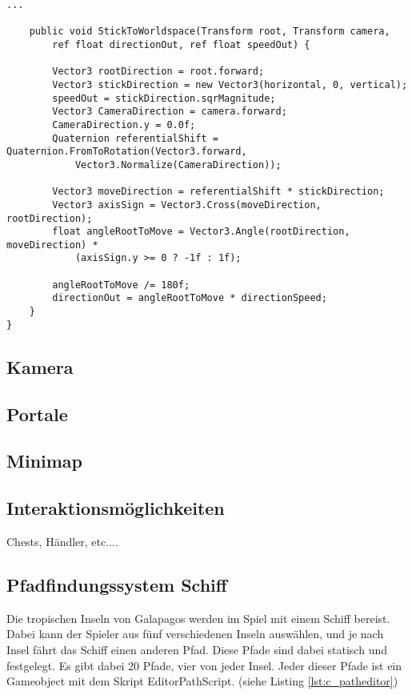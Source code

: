 \begin{scriptsize}
\begin{lstlisting}[label=lst:c_charactercontroller]
    ...

    public void StickToWorldspace(Transform root, Transform camera, 
    	ref float directionOut, ref float speedOut) {
    	
        Vector3 rootDirection = root.forward;
        Vector3 stickDirection = new Vector3(horizontal, 0, vertical);
        speedOut = stickDirection.sqrMagnitude;
        Vector3 CameraDirection = camera.forward;
        CameraDirection.y = 0.0f;
        Quaternion referentialShift = Quaternion.FromToRotation(Vector3.forward, 
        	Vector3.Normalize(CameraDirection));
        	
        Vector3 moveDirection = referentialShift * stickDirection;
        Vector3 axisSign = Vector3.Cross(moveDirection, rootDirection);
        float angleRootToMove = Vector3.Angle(rootDirection, moveDirection) * 
        	(axisSign.y >= 0 ? -1f : 1f);      
        	
        angleRootToMove /= 180f;
        directionOut = angleRootToMove * directionSpeed;
    }
}

\end{lstlisting}
\end{scriptsize}

\subsection{Kamera}



\subsection{Portale}



\subsection{Minimap}



\subsection{Interaktionsmöglichkeiten}
Chests, Händler, etc....


\subsection{Pfadfindungssystem Schiff}
Die tropischen Inseln von Galapagos werden im Spiel mit einem Schiff bereist. Dabei kann der Spieler aus fünf verschiedenen Inseln auswählen, und je nach Insel fährt das Schiff einen anderen Pfad. Diese Pfade sind dabei statisch und festgelegt. Es gibt dabei 20 Pfade, vier von jeder Insel. Jeder dieser Pfade ist ein Gameobject mit dem Skript EditorPathScript. (siehe Listing \ref{lst:c_patheditor})

